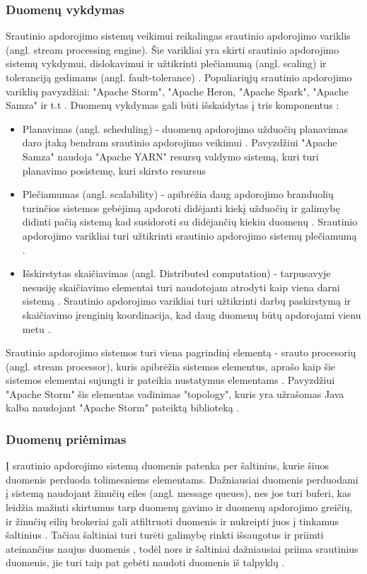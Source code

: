 \documentclass{VUMIFPSbakalaurinis}
\begin{document}
\subsubsection{Duomenų vykdymas}
Srautinio apdorojimo sistemų veikimui reikalingas srautinio apdorojimo variklis (angl. stream processing engine). Šie varikliai yra skirti srautinio apdorojimo sistemų vykdymui, dislokavimui ir užtikrinti plečiamumą (angl. scaling) ir toleranciją gedimams (angl. fault-tolerance) \cite{zhao2017taxonomy}. Populiariųjų srautinio apdorojimo variklių pavyzdžiai: "Apache Storm", "Apache Heron, "Apache Spark", "Apache Samza" ir t.t \cite{roger2019comprehensive}. 
Duomenų vykdymas gali būti išskaidytas į tris komponentus \cite{zhao2017taxonomy}: 
\begin{itemize}
    \item Planavimas (angl. scheduling) - duomenų apdorojimo užduočių planavimas daro įtaką bendram srautinio apdorojimo veikimui \cite{falt2011task}. Pavyzdžiui "Apache Samza" naudoja "Apache YARN" resursų valdymo sistemą, kuri turi planavimo posistemę, kuri skirsto resursus \cite{noghabi2017samza} 
    \item Plečiamumas (angl. scalability) - apibrėžia daug apdorojimo branduolių turinčios sistemos gebėjimą apdoroti didėjanti kiekį užduočių ir galimybę didinti pačią sistemą kad susidoroti su didėjančių kiekiu duomenų \cite{bondi2000characteristics}. Srautinio apdorojimo varikliai turi užtikrinti srautinio apdorojimo sistemų plečiamumą \cite{stonebraker20058}.    
    \item Išskirstytas skaičiavimas (angl. Distributed computation) - tarpusavyje nesusiję skaičiavimo elementai turi naudotojam atrodyti kaip viena darni sistemą \cite{tanenbaum2007distributed}. Srautinio apdorojimo varikliai turi užtikrinti darbų paskirstymą ir skaičiavimo įrenginių koordinacija, kad daug duomenų būtų apdorojami vienu metu \cite{zhao2017taxonomy}.
\end{itemize}
Srautinio apdorojimo sistemos turi viena pagrindinį elementą - srauto procesorių (angl. stream processor), kuris apibrėžia sistemos elementus, aprašo kaip šie sistemos elementai sujungti ir pateikia nustatymus elementams \cite{zhao2017taxonomy}. Pavyzdžiui "Apache Storm" šis elementas vadinimas "topology", kuris yra užrašomas Java kalba naudojant "Apache Storm" pateiktą biblioteką \cite{iqbal2015big}.
\subsubsection{Duomenų priėmimas}
Į srautinio apdorojimo sistemą duomenis patenka per šaltinius, kurie šiuos duomenis perduoda tolimesniems elementams. Dažniausiai duomenis perduodami į sistemą naudojant žinučių eiles (angl. message queues), nes jos turi buferi, kas leidžia mažinti skirtumus tarp duomenų gavimo ir duomenų apdorojimo greičių, ir žinučių eilių brokeriai gali atfiltruoti duomenis ir nukreipti juos į tinkamus šaltinius \cite{kamburugamuve2016survey}. Tačiau šaltiniai turi turėti galimybę rinkti išsaugotus ir priimti ateinančius naujus duomenis \cite{stonebraker20058}, todėl nors ir šaltiniai dažniausiai priima srautinius duomenis, jie turi taip pat gebėti naudoti duomenis iš talpyklų \cite{zhao2017taxonomy}. 
\end{document}
